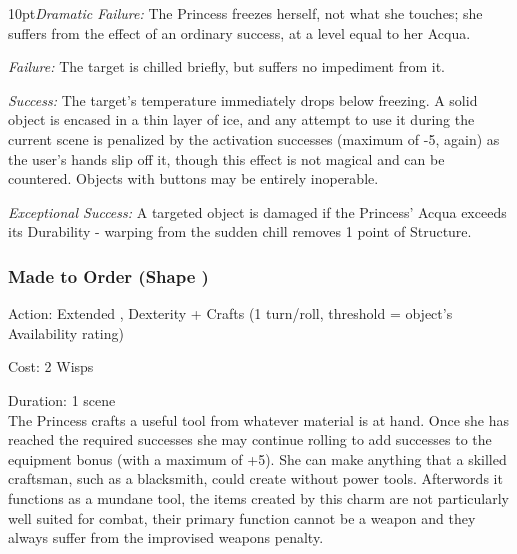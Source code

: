 \begin{myindentpar}{10pt}\emph{Dramatic Failure:} The Princess freezes herself, not what she touches; she suffers from the effect of an ordinary success, at a level equal to her Acqua.

\emph{Failure:} The target is chilled briefly, but suffers no impediment from it.

\emph{Success:} The target's temperature immediately drops below freezing. A solid object is encased in a thin layer of ice, and any attempt to use it during the current scene is penalized by the activation successes (maximum of -5, again) as the user's hands slip off it, though this effect is not magical and can be countered. Objects with buttons may be entirely inoperable.

\emph{Exceptional Success:} A targeted object is damaged if the Princess' Acqua exceeds its Durability - warping from the sudden chill removes 1 point of Structure.\end{myindentpar}

\subsubsection*{Made to Order (Shape \textbullet\textbullet\textbullet)}
\noindent Action: Extended , Dexterity + Crafts (1 turn/roll, threshold = object's Availability rating)

\noindent Cost: 2 Wisps

\noindent Duration: 1 scene\\

\noindent The Princess crafts a useful tool from whatever material is at hand. Once she has reached the required successes she may continue rolling to add successes to the equipment bonus (with a maximum of +5). She can make anything that a skilled craftsman, such as a blacksmith, could create without power tools. Afterwords it functions as a mundane tool, the items created by this charm are not particularly well suited for combat, their primary function cannot be a weapon and they always suffer from the improvised weapons penalty.

